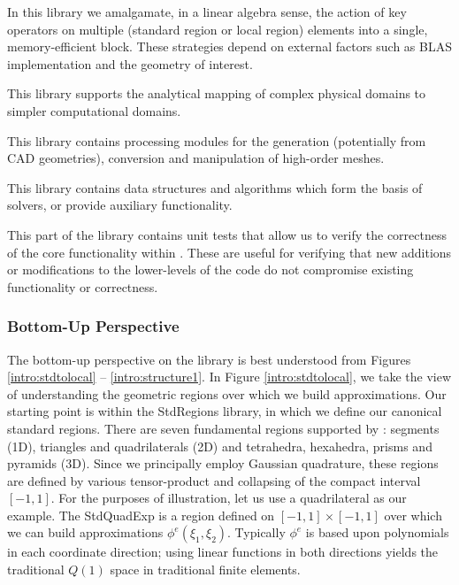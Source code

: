  In this library we amalgamate, in a linear algebra sense, the action of key operators on multiple 
(standard region or local region) elements into a single, memory-efficient block. These strategies depend on external
factors such as BLAS implementation and the geometry of interest. 

 This library supports the analytical mapping of complex physical domains to simpler computational domains.

 This library contains processing modules for the generation (potentially from CAD geometries), conversion and manipulation of high-order meshes.

 This library contains data structures and algorithms which form the basis of solvers, or provide auxiliary functionality.

 This part of the library contains unit tests that allow us to verify the correctness of the core functionality within {\nek}.  These are useful for verifying
that new additions or modifications to the lower-levels of the code do not compromise existing functionality or correctness.

\subsubsection{Bottom-Up Perspective}

The bottom-up perspective on the library is best understood from Figures \ref{intro:stdtolocal} -- \ref{intro:structure1}.  In Figure \ref{intro:stdtolocal}, we
take the view of understanding the geometric regions over which we build approximations.  Our starting point is within the StdRegions library, in which
we define our canonical standard regions.  There are seven fundamental regions supported by \nek{}:  segments (1D), triangles and quadrilaterals (2D) and tetrahedra, hexahedra,
prisms and pyramids (3D).  Since we principally employ Gaussian quadrature, these regions are defined by various tensor-product and collapsing of the
compact interval $[-1,1]$.  For the purposes of illustration, let us use a quadrilateral as our example.  The StdQuadExp is a region defined on $[-1,1] \times [-1,1]$
over which we can build approximations $\phi^e(\xi_1,\xi_2)$.  Typically $\phi^e$ is based upon polynomials in each coordinate direction; using linear functions
in both directions yields the traditional $Q(1)$ space in traditional finite elements.   

